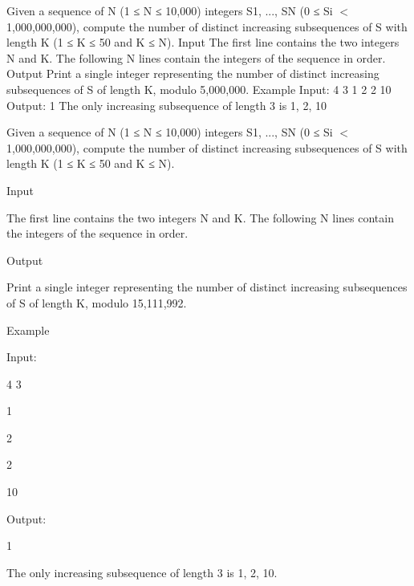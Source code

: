 



     Given a sequence of N (1 ≤ N ≤ 10,000) integers S1, ..., SN (0 ≤ Si $<$ 1,000,000,000), compute the number of distinct increasing subsequences of S with length K (1 ≤ K ≤ 50 and K ≤ N).       Input       The first line contains the two integers N and K. The following N lines contain the integers of the sequence in order.       Output       Print a single integer representing the number of distinct increasing subsequences of S of length K, modulo 5,000,000.       Example       Input:       4 3       1       2       2       10       Output:       1       The only increasing subsequence of length 3 is 1, 2, 10    



   Given a sequence of N (1 ≤ N ≤ 10,000) integers S1, ..., SN (0 ≤ Si $<$ 1,000,000,000), compute the number of distinct increasing subsequences of S with length K (1 ≤ K ≤ 50 and K ≤ N).  



   Input  



   The first line contains the two integers N and K. The following N lines contain the integers of the sequence in order.  



   Output  



   Print a single integer representing the number of distinct increasing subsequences of S of length K, modulo 15,111,992.  



   Example  



   Input:  

   4 3  

   1  

   2  

   2  

   10  



   Output:  

   1  

   The only increasing subsequence of length 3 is 1, 2, 10.  



